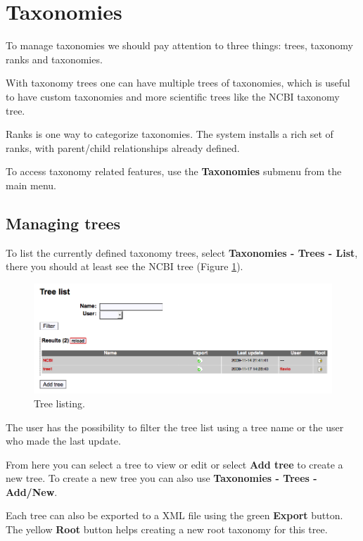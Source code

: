 \section{Taxonomies}

To manage taxonomies we should pay attention to three things: trees, taxonomy ranks and taxonomies.

With taxonomy trees one can have multiple trees of taxonomies, which is useful to have custom
taxonomies and more scientific trees like the NCBI taxonomy tree.

Ranks is one way to categorize taxonomies. The system installs a rich set of ranks,
with parent/child relationships already defined.

To access taxonomy related features, use the \textbf{Taxonomies} submenu from the main menu.

\subsection{Managing trees}

To list the currently defined taxonomy trees, select \textbf{Taxonomies - Trees - List}, there
you should at least see the NCBI tree (Figure \ref{fig:tree_list}).

\begin{figure}[H]
  \centering
    \includegraphics[scale=0.4]{tree_list.png}
  \caption{Tree listing.}
  \label{fig:tree_list}
\end{figure}

The user has the possibility to filter the tree list using a tree name or the user who made the last update.

From here you can select a tree to view or edit or select \textbf{Add tree} to create a new tree.
To create a new tree you can also use \textbf{Taxonomies - Trees - Add/New}.

Each tree can also be exported to a XML file using the green \textbf{Export} button.
The yellow \textbf{Root} button helps creating a new root taxonomy for this tree.

